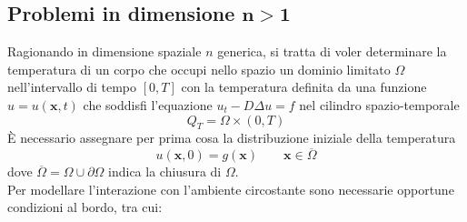 \documentclass[a4paper,12pt, draft]{article}
\theoremstyle{break}
\numberwithin{equation}{section}
\begin{document}
\subsection{Problemi in dimensione $\mathbf{n>1}$}
Ragionando in dimensione spaziale $n$ generica, si tratta di voler determinare la temperatura di un corpo che occupi nello spazio un dominio limitato $\Omega$ nell'intervallo di tempo $[0,T]$ con la temperatura definita da una funzione $u = u(\bm{x}, t)$ che soddisfi l'equazione $u_t - D\Delta u = f$ nel cilindro spazio-temporale
$$Q_T = \Omega \times (0, T)$$
È necessario assegnare per prima cosa la distribuzione iniziale della temperatura
$$u(\bm{x}, 0) = g(\bm{x}) \qquad \bm{x} \in \overline{\Omega}$$ 
dove $\overline{\Omega} = \Omega\cup \partial \Omega$ indica la chiusura di $\Omega$.\\
Per modellare l'interazione con l'ambiente circostante sono necessarie opportune condizioni al bordo, tra cui:
\end{document}
